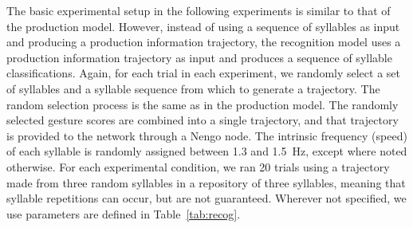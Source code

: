 The basic experimental setup
in the following experiments
is similar to that of the production model.
However, instead of using
a sequence of syllables
as input and producing
a production information trajectory,
the recognition model
uses a production information trajectory
as input and produces
a sequence of syllable classifications.
Again, for each trial in each experiment,
we randomly select a set of syllables
and a syllable sequence
from which to generate a trajectory.
The random selection process
is the same as in the production model.
The randomly selected
gesture scores are combined
into a single trajectory,
and that trajectory
is provided to the network
through a Nengo node.
The intrinsic frequency (speed)
of each syllable is randomly assigned
between 1.3 and 1.5~Hz,
except where noted otherwise.
For each experimental condition,
we ran 20 trials using
a trajectory made from
three random syllables
in a repository of three syllables,
meaning that syllable repetitions can occur,
but are not guaranteed.
Wherever not specified,
we use parameters are defined in
Table~\ref{tab:recog}.

